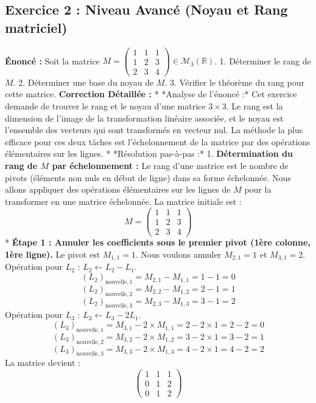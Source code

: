 \documentclass[12pt,a4paper]{report}
\begin{document}
\subsection{Exercice 2 : Niveau Avancé (Noyau et Rang matriciel)}
\textbf{Énoncé :} Soit la matrice $M = \begin{pmatrix} 1 & 1 & 1 \\ 1 & 2 & 3 \\ 2 & 3 & 4 \end{pmatrix} \in \mathcal{M}_3(\mathbb{R})$.
1.  Déterminer le rang de $M$.
2.  Déterminer une base du noyau de $M$.
3.  Vérifier le théorème du rang pour cette matrice.
\textbf{Correction Détaillée :}
*   *Analyse de l'énoncé :* Cet exercice demande de trouver le rang et le noyau d'une matrice $3 \times 3$. Le rang est la dimension de l'image de la transformation linéaire associée, et le noyau est l'ensemble des vecteurs qui sont transformés en vecteur nul. La méthode la plus efficace pour ces deux tâches est l'échelonnement de la matrice par des opérations élémentaires sur les lignes.
*   *Résolution pas-à-pas :*
    1.  \textbf{Détermination du rang de $M$ par échelonnement :}
        Le rang d'une matrice est le nombre de pivots (éléments non nuls en début de ligne) dans sa forme échelonnée. Nous allons appliquer des opérations élémentaires sur les lignes de $M$ pour la transformer en une matrice échelonnée.
        La matrice initiale est :
        $$M = \begin{pmatrix} 1 & 1 & 1 \\ 1 & 2 & 3 \\ 2 & 3 & 4 \end{pmatrix}$$
        *   \textbf{Étape 1 : Annuler les coefficients sous le premier pivot (1ère colonne, 1ère ligne).}
            Le pivot est $M_{1,1}=1$. Nous voulons annuler $M_{2,1}=1$ et $M_{3,1}=2$.
            Opération pour $L_2$ : $L_2 \leftarrow L_2 - L_1$.
            $$(L_2)_{\text{nouvelle},1} = M_{2,1} - M_{1,1} = 1 - 1 = 0$$
            $$(L_2)_{\text{nouvelle},2} = M_{2,2} - M_{1,2} = 2 - 1 = 1$$
            $$(L_2)_{\text{nouvelle},3} = M_{2,3} - M_{1,3} = 3 - 1 = 2$$
            Opération pour $L_3$ : $L_3 \leftarrow L_3 - 2L_1$.
            $$(L_3)_{\text{nouvelle},1} = M_{3,1} - 2 \times M_{1,1} = 2 - 2 \times 1 = 2 - 2 = 0$$
            $$(L_3)_{\text{nouvelle},2} = M_{3,2} - 2 \times M_{1,2} = 3 - 2 \times 1 = 3 - 2 = 1$$
            $$(L_3)_{\text{nouvelle},3} = M_{3,3} - 2 \times M_{1,3} = 4 - 2 \times 1 = 4 - 2 = 2$$
            La matrice devient :
            $$\begin{pmatrix} 1 & 1 & 1 \\ 0 & 1 & 2 \\ 0 & 1 & 2 \end{pmatrix}$$
\end{document}
